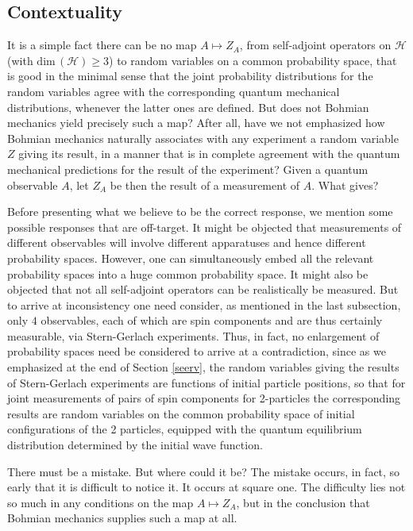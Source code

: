\documentclass[12pt]{article}
\newcommand{\sa}{self-adjoint}
\newcommand{\BM}{Bohmian mechanics}
\newcommand{\wf}{wave function}
\renewcommand{\H}{\mbox{$\mathcal{H}$}}
\newcommand{\rv}{Z}
\begin{document}
\subsection{Contextuality}\label{sec:context}

It is a simple fact there can be no map $A\mapsto {\rv}_A$, {}from
\sa{} operators on \H{} (with $\mbox{dim}\,(\H)\ge{}3$) to random
variables on a common probability space, that is good in the minimal
sense that the joint probability distributions for the random
variables agree with the corresponding quantum mechanical
distributions, whenever the latter ones are defined. But does not
\BM{} yield precisely such a map? After all, have we not emphasized
how \BM{} naturally associates with any experiment a random variable
$Z$ giving its result, in a manner that is in complete agreement with
the quantum mechanical predictions for the result of the experiment?
Given a quantum observable $A$, let $Z_A$ be then the result of a
measurement of $A$.  What gives?

Before presenting what we believe to be the correct response, we
mention some possible responses that are off-target.  It might be
objected that measurements of different observables will involve
different apparatuses and hence different probability spaces. However,
one can simultaneously embed all the relevant probability spaces into
a huge common probability space.  It might also be objected that not
all \sa{} operators can be realistically be measured. But to arrive at
inconsistency one need consider, as mentioned in the last subsection,
only $4$ observables, each of which are spin components and are thus
certainly measurable, via Stern-Gerlach experiments. Thus, in fact, no
enlargement of probability spaces need be considered to arrive at a
contradiction, since as we emphasized at the end of Section
\ref{seerv}, the random variables giving the results of Stern-Gerlach
experiments are functions of initial particle positions, so that for
joint measurements of pairs of spin components for 2-particles the
corresponding results are random variables on the common probability
space of initial configurations of the 2 particles, equipped with the
quantum equilibrium distribution determined by the initial \wf{}.

There must be a mistake. But where could it be? The mistake occurs, in
fact, so early that it is difficult to notice it. It occurs at square
one.  The difficulty lies not so much in any conditions on the map
$A\mapsto\rv_A$, but in the conclusion that \BM{} supplies such a map
at all.
\end{document}
